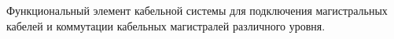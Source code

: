 Функциональный элемент кабельной системы для 
подключения магистральных кабелей и коммутации 
кабельных магистралей различного уровня.